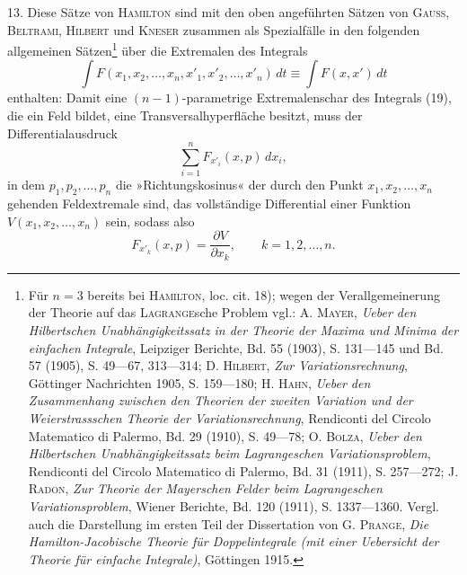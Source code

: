 \clearpage\begingroup\NoSourceHead{}
\renewcommand{\thefootnote}{\arabic{footnote})}\setcounter{footnote}{19}
\noindent\hspace*{\parindent}13. Diese Sätze von \textsc{Hamilton} sind mit den oben angeführten Sätzen
von \textsc{Gauss}, \textsc{Beltrami}, \textsc{Hilbert} und \textsc{Kneser} zusammen als Spezialfälle in den
folgenden allgemeinen Sätzen\footnote{Für $n=3$ bereits bei \textsc{Hamilton}, loc. cit. 18); wegen der Verallgemeinerung der Theorie auf das
\textsc{Lagrange}sche Problem vgl.: A. \textsc{Mayer}, \textit{Ueber den Hilbertschen Unabhängigkeitssatz in der Theorie der
Maxima und Minima der einfachen Integrale}, Leipziger Berichte, Bd. 55 (1903), S. 131—145 und Bd. 57
(1905), S. 49—67, 313—314; D. \textsc{Hilbert}, \textit{Zur Variationsrechnung}, Göttinger Nachrichten 1905, S. 159—180;
H. \textsc{Hahn}, \textit{Ueber den Zusammenhang zwischen den Theorien der zweiten Variation und der Weierstrassschen
Theorie der Variationsrechnung}, Rendiconti del Circolo Matematico di Palermo, Bd. 29 (1910), S. 49—78;
O. \textsc{Bolza}, \textit{Ueber den Hilbertschen Unabhängigkeitssatz beim Lagrangeschen Variationsproblem}, Rendiconti
del Circolo Matematico di Palermo, Bd. 31 (1911), S. 257—272; J. \textsc{Radon}, \textit{Zur Theorie der Mayerschen
Felder beim Lagrangeschen Variationsproblem}, Wiener Berichte, Bd. 120 (1911), S. 1337—1360. Vergl. auch
die Darstellung im ersten Teil der Dissertation von G. \textsc{Prange}, \textit{Die Hamilton-Jacobische Theorie für Doppelintegrale
(mit einer Uebersicht der Theorie für einfache Integrale)}, Göttingen 1915.} über die Extremalen des Integrals
\clearpage{}
\begin{equation*}\tag{19}
\int F(x_1,x_2,\ldots,x_n,x'_1,x'_2,\ldots,x'_n)\,dt\equiv\int F(x,x')\,dt
\end{equation*}
enthalten: Damit eine $(n-1)$-parametrige Extremalenschar des Integrals (19),
die ein Feld bildet, eine Transversalhyperfläche besitzt, muss der Differentialausdruck
\begin{equation*}\tag{34}
\sum_{i=1}^n F_{x'_i}(x,p)\,dx_i,
\end{equation*}
in dem $p_1,p_2,\ldots,p_n$ die »Richtungskosinus« der durch den Punkt $x_1,x_2,\ldots,x_n$
gehenden Feldextremale sind, das vollständige Differential einer Funktion
$V(x_1,x_2,\ldots,x_n)$ sein, sodass also
\begin{equation*}\tag{35}
F_{x'_k}(x,p)=\frac{\partial V}{\partial x_k},\qquad k=1,2,\ldots,n.
\end{equation*}

